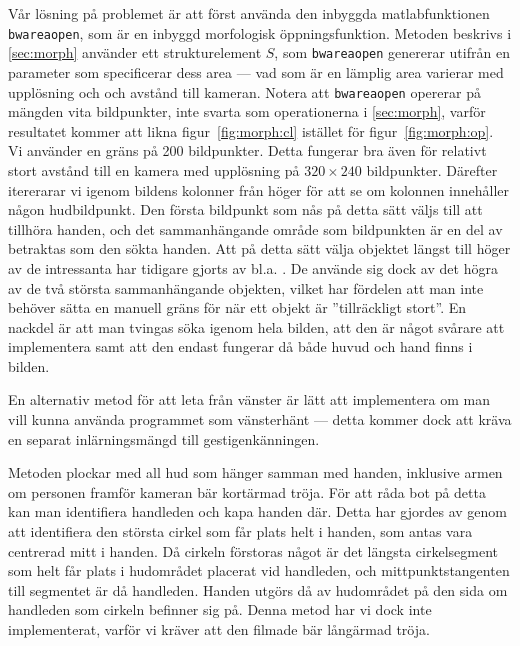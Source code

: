 Vår lösning på problemet är att först använda den inbyggda
matlabfunktionen \texttt{bwareaopen}, som är en inbyggd morfologisk
öppningsfunktion. Metoden beskrivs i
\ref{sec:morph} använder ett strukturelement $S$, som \texttt{bwareaopen}
genererar utifrån en parameter som specificerar
dess area --- vad som är en lämplig area
varierar med upplösning och
och avstånd till kameran. Notera att \texttt{bwareaopen} opererar på mängden
vita bildpunkter, inte svarta som operationerna i \ref{sec:morph}, varför
resultatet kommer att likna figur~\ref{fig:morph:cl} istället för
figur~\ref{fig:morph:op}.  Vi använder en gräns på 200
bildpunkter. Detta fungerar bra även för relativt stort avstånd till
 en kamera med upplösning på $320\times240$ bildpunkter. Därefter itererarar vi
igenom bildens kolonner från
höger för att se om kolonnen innehåller någon hudbildpunkt. Den första
bildpunkt som nås på detta sätt väljs till att tillhöra handen, och det
sammanhängande område som bildpunkten är en del av betraktas som den sökta
handen. Att på detta sätt välja objektet längst till höger av de
intressanta har tidigare gjorts av bl.a. . De använde
sig dock av det högra av de två största sammanhängande objekten,
vilket har fördelen att man inte behöver sätta en manuell gräns för
när ett objekt är ''tillräckligt stort''. En nackdel är att man tvingas
söka igenom hela bilden, att den är något svårare att
implementera samt att den endast fungerar då både huvud och hand finns
i bilden.

En alternativ metod för att leta från
vänster är lätt att implementera om man vill kunna använda programmet
som vänsterhänt --- detta kommer dock att kräva en
separat inlärningsmängd till gestigenkänningen.

Metoden plockar med all hud som hänger samman med
handen, inklusive armen om personen framför kameran bär kortärmad tröja. För att
råda bot på detta kan man identifiera handleden och kapa handen
där. Detta har gjordes av  genom att identifiera den största cirkel
som får plats helt i handen, som antas vara centrerad mitt i handen. Då
cirkeln förstoras något är det längsta cirkelsegment som helt får
plats i hudområdet placerat vid handleden, och mittpunktstangenten
till segmentet är då handleden. Handen utgörs då av hudområdet på den
sida om handleden som cirkeln befinner sig på. Denna metod har vi dock
inte implementerat, varför vi kräver att den filmade bär
långärmad tröja. 
